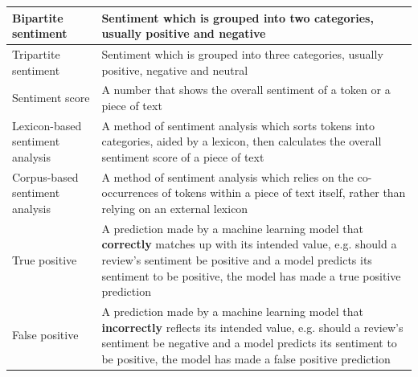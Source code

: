 \documentclass[12pt, bibliography=totocnumbered, a4paper]{scrartcl}
\def\bf#1{\textbf{#1}}
\begin{document}
\begin{center}
\begin{longtable}{|p{}|p{}|}
		\hline
		Bipartite sentiment              & Sentiment which is grouped into two categories, usually positive and negative                                                                                                                                                                       \\
		\hline
		Tripartite sentiment             & Sentiment which is grouped into three categories, usually positive, negative and neutral                                                                                                                                                            \\
		\hline
		Sentiment score                  & A number that shows the overall sentiment of a token or a piece of text                                                                                                                                                                             \\
		\hline
		Lexicon-based sentiment analysis & A method of sentiment analysis which sorts tokens into categories, aided by a lexicon, then calculates the overall sentiment score of a piece of text                                                                                               \\
		\hline
		Corpus-based sentiment analysis  & A method of sentiment analysis which relies on the co-occurrences of tokens within a piece of text itself, rather than relying on an external lexicon                                                                                               \\
		\hline
		True positive                    & A prediction made by a machine learning model that \bf{correctly} matches up with its intended value, e.g. should a review’s sentiment be positive and a model predicts its sentiment to be positive, the model has made a true positive prediction \\
		\hline
		False positive                   & A prediction made by a machine learning model that \bf{incorrectly} reflects its intended value, e.g. should a review’s sentiment be negative and a model predicts its sentiment to be positive, the model has made a false positive prediction     \\
		\hline
	\end{longtable}
\end{center}
\end{document}
